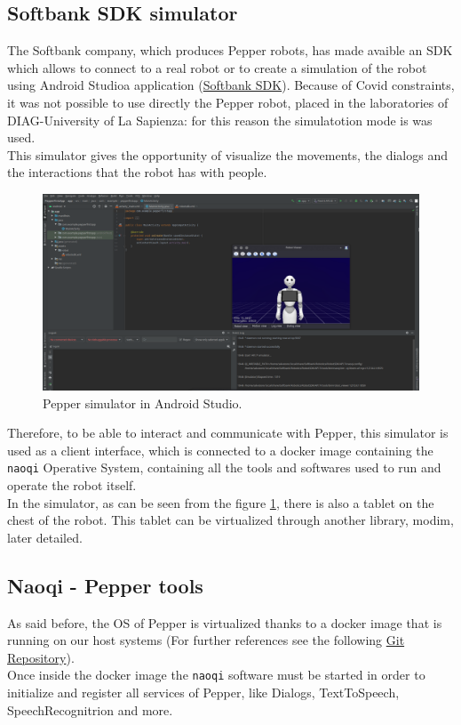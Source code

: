 \documentclass[12pt, letterpaper, twoside]{article}
\begin{document}
\subsection{Softbank SDK simulator}
The Softbank company, which produces Pepper robots, has made avaible an SDK which allows to connect to a real robot or to create a simulation of the robot using Android Studioa application (\href{https://qisdk.softbankrobotics.com/sdk/doc/pepper-sdk/index.html}{Softbank SDK}). Because of Covid constraints, it was not possible to use directly the Pepper robot, placed in the laboratories of DIAG-University of La Sapienza: for this reason the simulatotion mode is was used.\\

This simulator gives the opportunity of visualize the movements, the dialogs and the interactions that the robot has with people.

\begin{figure}[htbp]
	\centerline{\includegraphics[scale=.3]{img/pepperSDK.png}}
	\caption{Pepper simulator in Android Studio.}
	\label{fig:android_sdk}
\end{figure}

Therefore, to be able to interact and communicate with Pepper, this simulator is used as a client interface, which is connected to a docker image containing the \verb|naoqi| Operative System, containing all the tools and softwares used to run and operate the robot itself.\\
In the simulator, as can be seen from the figure \ref{fig:android_sdk}, there is also a tablet on the chest of the robot. This tablet can be virtualized through another library, modim, later detailed.

\subsection{Naoqi - Pepper tools}
As said before, the OS of Pepper is virtualized thanks to a docker image that is running on our host systems (For further references see the following \href{https://bitbucket.org/iocchi/hri_software/src/master/}{Git Repository}).\\
Once inside the docker image the \verb|naoqi| software must be started in order to initialize and register all services of Pepper, like Dialogs, TextToSpeech, SpeechRecognitrion and more.\\
\end{document}
